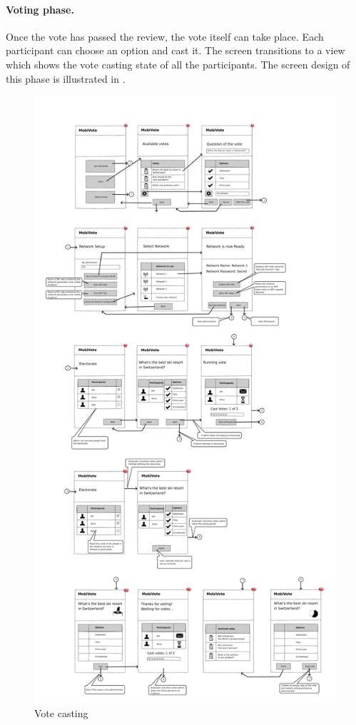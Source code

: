 \documentclass[numbers=noenddot, abstract=on, a4paper, headsepline,
footsepline, oneside, draft=off]{scrreprt}
\begin{document}
\paragraph{Voting phase.}
Once the vote has passed the review, the vote itself can take place. Each
participant can choose an option and cast it. The screen transitions to a view
which shows the vote casting state of all the participants. The screen
design of this phase is illustrated in .

\begin{figure}[htb]
	\centering
	\includegraphics[height=.4\textheight]{img/storyboard/vote}
	\caption{Vote casting}
	\label{fig:vote}
\end{figure}
\end{document}
